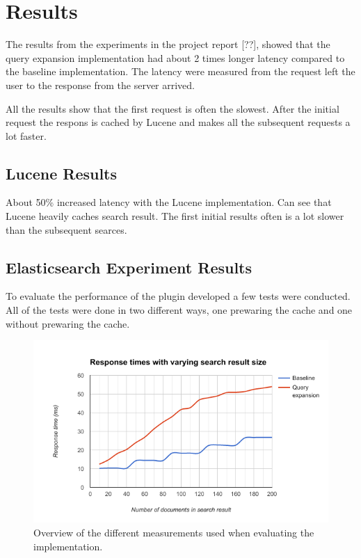 \section{Results}
\label{sec:results}
The results from the experiments in the project report [??],
showed that the query expansion implementation had about 2 times longer latency compared to the baseline implementation.
The latency were measured from the request left the user to the response from the server arrived.

All the results show that the first request is often the slowest.
After the initial request the respons is cached by Lucene and makes all the subsequent requests a lot faster.

\subsection{Lucene Results}
About 50\% increased latency with the Lucene implementation.
Can see that Lucene heavily caches search result.
The first initial results often is a lot slower than the subsequent searces.

\subsection{Elasticsearch Experiment Results}
To evaluate the performance of the plugin developed a few tests were conducted.
All of the tests were done in two different ways,
one prewaring the cache and one without prewaring the cache.


\begin{figure}[h!]
  \centering \includegraphics[width=1\linewidth]{img/result-vary-result-size.png}
  \caption{Overview of the different measurements used when evaluating the implementation.}
  \label{fig:result-vary-result-size}
\end{figure}

